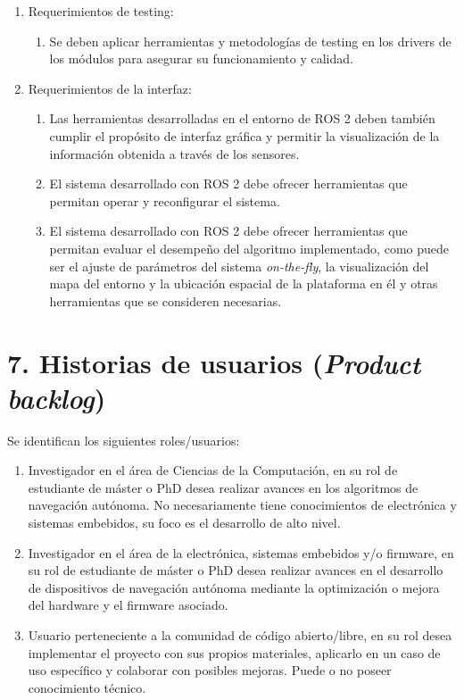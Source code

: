 \documentclass[
11pt, %
codirector, %
]{charter}
\begin{document}
\begin{enumerate}
\item Requerimientos de testing:
\begin{enumerate}
	\item Se deben aplicar herramientas y metodologías de testing en los drivers de los módulos para asegurar su funcionamiento y calidad.
\end{enumerate}

\item Requerimientos de la interfaz:
\begin{enumerate}
	\item Las herramientas desarrolladas en el entorno de ROS 2 deben también cumplir el propósito de interfaz gráfica y permitir la visualización de la información obtenida a través de los sensores.
	\item El sistema desarrollado con ROS 2 debe ofrecer herramientas que permitan operar y reconfigurar el sistema.
	\item El sistema desarrollado con ROS 2 debe ofrecer herramientas que permitan evaluar el desempeño del algoritmo implementado, como puede ser el ajuste de parámetros del sistema \textit{on-the-fly}, la visualización del mapa del entorno y la ubicación espacial de la plataforma en él y otras herramientas que se consideren necesarias.
\end{enumerate}
\end{enumerate}

\section{7. Historias de usuarios (\textit{Product backlog})}
\label{sec:backlog}

Se identifican los siguientes roles/usuarios:
\begin{enumerate}
	\item Investigador en el área de Ciencias de la Computación, en su rol de estudiante de máster o PhD desea realizar avances en los algoritmos de navegación autónoma. No necesariamente tiene conocimientos de electrónica y sistemas embebidos, su foco es el desarrollo de alto nivel.
	\item Investigador en el área de la electrónica, sistemas embebidos y/o firmware, en su rol de estudiante de máster o PhD desea realizar avances en el desarrollo de dispositivos de navegación autónoma mediante la optimización o mejora del hardware y el firmware asociado.
	\item Usuario perteneciente a la comunidad de código abierto/libre, en su rol desea implementar el proyecto con sus propios materiales, aplicarlo en un caso de uso específico y colaborar con posibles mejoras. Puede o no poseer conocimiento técnico.
\end{enumerate}
\end{document}
